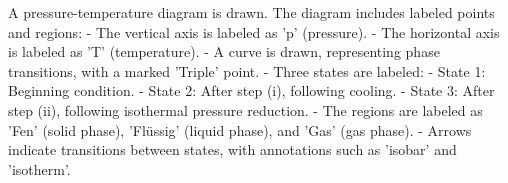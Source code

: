A pressure-temperature diagram is drawn. The diagram includes labeled points and regions:  
- The vertical axis is labeled as 'p' (pressure).  
- The horizontal axis is labeled as 'T' (temperature).  
- A curve is drawn, representing phase transitions, with a marked 'Triple' point.  
- Three states are labeled:  
  - State 1: Beginning condition.  
  - State 2: After step (i), following cooling.  
  - State 3: After step (ii), following isothermal pressure reduction.  
- The regions are labeled as 'Fen' (solid phase), 'Flüssig' (liquid phase), and 'Gas' (gas phase).  
- Arrows indicate transitions between states, with annotations such as 'isobar' and 'isotherm'.